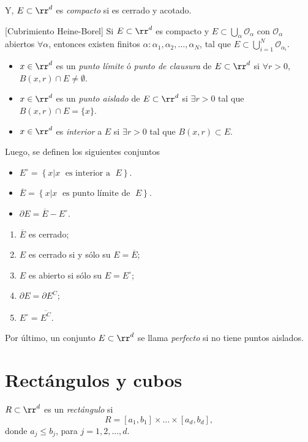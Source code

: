 Y, $E \subset \rr^d $ es \emph{compacto} si es cerrado y acotado.


\begin{teorema}{}[Cubrimiento Heine-Borel]
Si $E \subset \rr^d$ es compacto y $E\subset \bigcup\limits_{\alpha} \mathcal{O}_{\alpha}$
con $\mathcal{O}_{\alpha}$ abiertos $\forall \alpha$, entonces existen finitos $\alpha:\alpha_1,\alpha_2, \ldots,\alpha_N$, tal que 
$E \subset \bigcup\limits_{i=1}^N \mathcal{O}_{\alpha_i}$.
\end{teorema}

\begin{itemize}
    \item $x \in \rr^d$ es un \emph{punto l\'imite} \'o \emph{punto de clausura} de $E\subset \rr^d$
    si $\forall r>0$,\; $B(x,r)\cap E \neq \emptyset$.
    \item $x \in \rr^d$ es un \emph{punto aislado} de $E\subset \rr^d$ si $\exists r>0$ tal que $B(x,r)\cap E=\{x\}$.
    \item $x \in \rr^d$ es \emph{interior} a $E$ si $\exists r>0$ tal que $B(x,r) \subset E$.
\end{itemize}

Luego, se definen los siguientes conjuntos 
\begin{itemize}
    \item $E^{\circ}=\left\{x| x \;\mbox{ es interior a }\; E \right\}$.
    \item $\overline{E}=\left\{x| x \;\mbox{ es punto l\'imite de }\; E \right\}$.
    \item     $\partial E=\overline{E}-E^{\circ}$.
\end{itemize}

\begin{ejercicio}{}
\begin{enumerate}
    \item $\overline{E}$ es cerrado;
    \item $E$ es cerrado si y s\'olo su $E=\overline{E}$;
    \item $E$ es abierto si  s\'olo su $E=E^{\circ}$;
    \item $\partial E = \partial E^C$;
    \item $E^{\circ} = \overline{E^C}$.
\end{enumerate}
\end{ejercicio}

Por \'ultimo, un conjunto $E \subset \rr^d$ se llama \emph{perfecto} si no tiene puntos aislados.

\section{Rect\'angulos y cubos}
\begin{definicion}{}
$R \subset \rr^d$ es un \emph{rect\'angulo} si 
\[
R=[a_1,b_1]\times\ldots\times [a_d,b_d],
\]
donde $a_j\leq b_j$, para $j=1,2,\ldots,d$.
\end{definicion}


